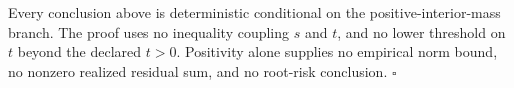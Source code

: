 Every conclusion above is deterministic conditional on the positive-interior-mass branch. The proof uses no inequality coupling \(s\) and \(t\), and no lower threshold on \(t\) beyond the declared \(t>0\). Positivity alone supplies no empirical norm bound, no nonzero realized residual sum, and no root-risk conclusion. \(\square\)